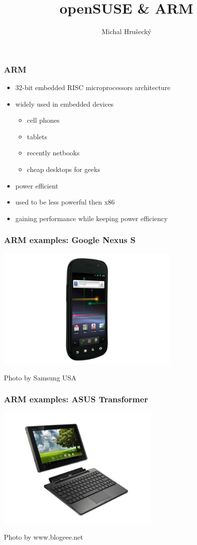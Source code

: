 \documentclass{beamer}
\author{Michal Hru\v{s}eck\'{y}\newline {\small openSUSE Boosters}}
\title{openSUSE \& ARM}
\begin{document}
\begin{frame}[t,plain]
\titlepage
\end{frame}


\begin{frame}[t]
\frametitle{ARM}
\begin{itemize}
   \item 32-bit embedded RISC microprocessors architecture
   \item widely used in embedded devices
   \begin{itemize}
   	\item cell phones
	\item tablets
	\item recently netbooks
	\item cheap desktops for geeks
   \end{itemize}
   \item power efficient
   \item used to be less powerful then x86
   \item gaining performance while keeping power efficiency
\end{itemize}
\end{frame}

\begin{frame}[t]
\frametitle{ARM examples: Google Nexus S}
\begin{center}
\includegraphics[height=6cm]{Nexuss.jpg}

{\scriptsize Photo by Samsung USA}
\end{center}
\end{frame}

\begin{frame}[t]
\frametitle{ARM examples: ASUS Transformer}
\begin{center}
\includegraphics[height=6cm]{Transformer.jpg}

{\scriptsize Photo by www.blogeee.net}
\end{center}
\end{frame}
\end{document}
